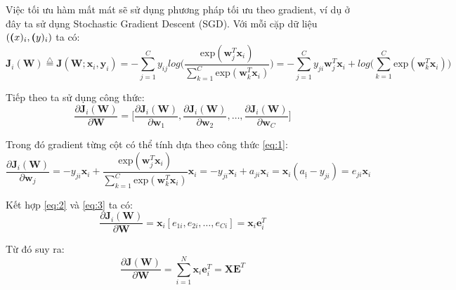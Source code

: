 Việc tối ưu hàm mất mát sẽ sử dụng phương pháp tối ưu theo gradient, ví dụ ở đây ta sử dụng Stochastic Gradient Descent (SGD).
Với mỗi cặp dữ liệu $(\textbf(x)_i, \textbf(y)_i)$ ta có:
\begin{equation} \label{eq:1}
    \textbf{J}_i(\textbf{W}) \stackrel{\bigtriangleup}{=} \textbf{J}(\textbf{W};\textbf{x}_i,\textbf{y}_i) = - \sum^C_{j=1}y_{ij}log\Big(\frac{\text{exp}(\textbf{w}^T_j\textbf{x}_i)}{\sum^C_{k=1}\text{exp}(\textbf{w}^T_k\textbf{x}_i)}\Big) = - \sum^C_{j=1}y_{ji}\textbf{w}^T_j\textbf{x}_i + log\Big(\sum^C_{k=1}\text{exp}(\textbf{w}^T_k\textbf{x}_i)\Big)
\end{equation}

Tiếp theo ta sử dụng công thức:
\begin{equation} \label{eq:2}
    \frac{\partial\textbf{J}_i(\textbf{W})}{\partial\textbf{W}} = \Bigg[\frac{\partial\textbf{J}_i(\textbf{W})}{\partial\textbf{w}_1}, \frac{\partial\textbf{J}_i(\textbf{W})}{\partial\textbf{w}_2},\dots,\frac{\partial\textbf{J}_i(\textbf{W})}{\partial\textbf{w}_C}\Bigg]
\end{equation}

Trong đó gradient từng cột có thể tính dựa theo công thức \ref{eq:1}:
\begin{equation}  \label{eq:3}
    \frac{\partial\textbf{J}_i(\textbf{W})}{\partial\textbf{w}_j} = -y_{ji}\textbf{x}_i + \frac{\text{exp}(\textbf{w}^T_j\textbf{x}_i)}{\sum^C_{k=1}\text{exp}(\textbf{w}^T_k\textbf{x}_i)}\textbf{x}_i = -y_{ji}\textbf{x}_i + a_{ji}\textbf{x}_i = \textbf{x}_i(a_{ị}-y_{ji}) = e_{ji}\textbf{x}_i
\end{equation}

Kết hợp \ref{eq:2} và \ref{eq:3} ta có:
\begin{equation*}
    \frac{\partial\textbf{J}_i(\textbf{W})}{\partial\textbf{W}} = \textbf{x}_i[e_{1i},e_{2i},
    \dots,e_{Ci}] = \textbf{x}_i\textbf{e}^T_i
\end{equation*}

Từ đó suy ra:
\begin{equation*}
     \frac{\partial\textbf{J}(\textbf{W})}{\partial\textbf{W}} = \sum^N_{i=1}\textbf{x}_i\textbf{e}^T_i = \textbf{X}\textbf{E}^T
\end{equation*}